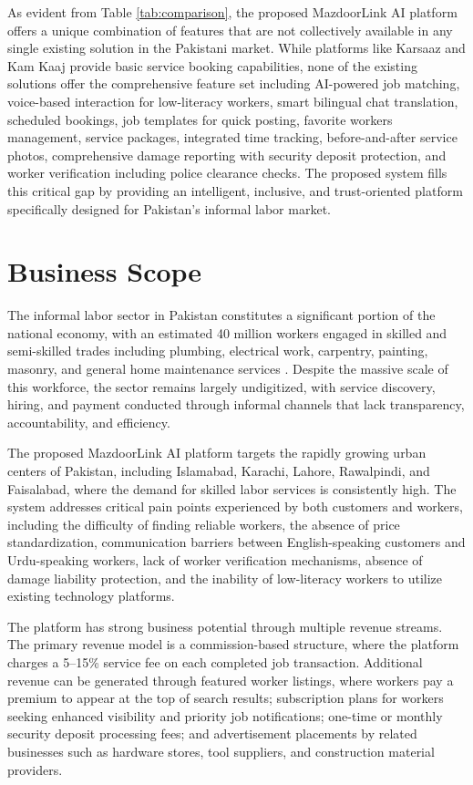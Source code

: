 \documentclass[12pt,a4paper]{report}
\begin{document}
As evident from Table \ref{tab:comparison}, the proposed MazdoorLink AI platform offers a unique combination of features that are not collectively available in any single existing solution in the Pakistani market. While platforms like Karsaaz and Kam Kaaj provide basic service booking capabilities, none of the existing solutions offer the comprehensive feature set including AI-powered job matching, voice-based interaction for low-literacy workers, smart bilingual chat translation, scheduled bookings, job templates for quick posting, favorite workers management, service packages, integrated time tracking, before-and-after service photos, comprehensive damage reporting with security deposit protection, and worker verification including police clearance checks. The proposed system fills this critical gap by providing an intelligent, inclusive, and trust-oriented platform specifically designed for Pakistan's informal labor market.

\section{Business Scope}

The informal labor sector in Pakistan constitutes a significant portion of the national economy, with an estimated 40 million workers engaged in skilled and semi-skilled trades including plumbing, electrical work, carpentry, painting, masonry, and general home maintenance services \cite{pbs}. Despite the massive scale of this workforce, the sector remains largely undigitized, with service discovery, hiring, and payment conducted through informal channels that lack transparency, accountability, and efficiency.

The proposed MazdoorLink AI platform targets the rapidly growing urban centers of Pakistan, including Islamabad, Karachi, Lahore, Rawalpindi, and Faisalabad, where the demand for skilled labor services is consistently high. The system addresses critical pain points experienced by both customers and workers, including the difficulty of finding reliable workers, the absence of price standardization, communication barriers between English-speaking customers and Urdu-speaking workers, lack of worker verification mechanisms, absence of damage liability protection, and the inability of low-literacy workers to utilize existing technology platforms.

The platform has strong business potential through multiple revenue streams. The primary revenue model is a commission-based structure, where the platform charges a 5--15\% service fee on each completed job transaction. Additional revenue can be generated through featured worker listings, where workers pay a premium to appear at the top of search results; subscription plans for workers seeking enhanced visibility and priority job notifications; one-time or monthly security deposit processing fees; and advertisement placements by related businesses such as hardware stores, tool suppliers, and construction material providers.
\end{document}
